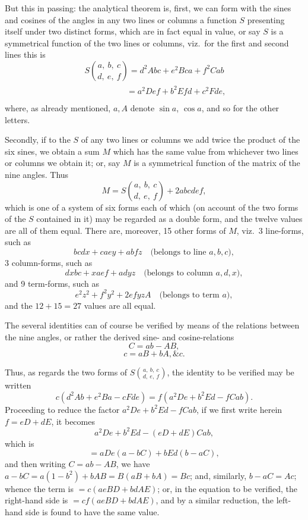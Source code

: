 \documentclass[11pt,a4paper]{article}
\begin{document}
\medskip

But this in passing: the analytical theorem is, first, we can form with the sines and cosines of the angles in any two lines or columns a function $S$ presenting itself under two distinct forms, which are in fact equal in value, or say $S$ is a symmetrical function of the two lines or columns, viz.\ for the first and second lines this is
\[
S\binom{a,\ b,\ c}{d,\ e,\ f} = d^{2}Abc + e^{2}Bca + f^{2}Cab
\]
\[
\phantom{S\binom{a,\ b,\ c}{d,\ e,\ f}} = a^{2}Def + b^{2}Efd + c^{2}Fde,
\]
where, as already mentioned, $a, A$ denote $\sin a$, $\cos a$, and so for the other letters.

\medskip

Secondly, if to the $S$ of any two lines or columns we add twice the product of the six sines, we obtain a sum $M$ which has the same value from whichever two lines or columns we obtain it; or, say $M$ is a symmetrical function of the matrix of the nine angles. Thus
\[
M = S\binom{a,\ b,\ c}{d,\ e,\ f} + 2abcdef,
\]
which is one of a system of six forms each of which (on account of the two forms of the $S$ contained in it) may be regarded as a double form, and the twelve values are all of them equal. There are, moreover, 15 other forms of $M$, viz.\ 3 line-forms, such as
\[
bcdx + caey + abfz \quad\text{(belongs to line $a, b, c$)},
\]
3 column-forms, such as
\[
dxbc + xaef + adyz \quad\text{(belongs to column $a, d, x$)},
\]
and 9 term-forms, such as
\[
e^{2}z^{2} + f^{2}y^{2} + 2efyzA \quad\text{(belongs to term $a$)},
\]
and the $12 + 15 = 27$ values are all equal.

\medskip

The several identities can of course be verified by means of the relations between the nine angles, or rather the derived sine- and cosine-relations
\[
C = ab - AB,
\]
\[
c = aB + bA, \&c.
\]

\newpage


Thus, as regards the two forms of $S\binom{a,\ b,\ c}{d,\ e,\ f}$, the identity to be verified may be written
\[
c(d^{2}Ab + e^{2}Ba - cFde) = f(a^{2}De + b^{2}Ed - fCab).
\]
Proceeding to reduce the factor $a^{2}De + b^{2}Ed - fCab$, if we first write herein $f = eD + dE$, it becomes
\[
a^{2}De + b^{2}Ed - (eD + dE)Cab,
\]
which is
\[
= aDe(a - bC) + bEd(b - aC),
\]
and then writing $C = ab - AB$, we have $a - bC = a(1 - b^{2}) + bAB = B(aB + bA) = Bc$; and, similarly, $b - aC = Ac$; whence the term is $= c(aeBD + bdAE)$; or, in the equation to be verified, the right-hand side is $= cf(aeBD + bdAE)$, and by a similar reduction, the left-hand side is found to have the same value.
\end{document}

